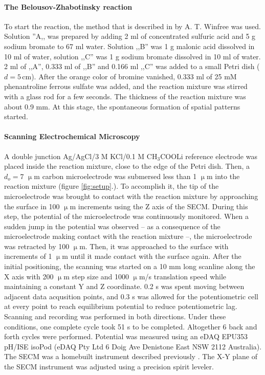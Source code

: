 \documentclass[3p, twocolumn]{elsarticle}
\begin{document}
\paragraph{The Belousov-Zhabotinsky reaction} 
To start the reaction, the method that is described in \cite{winfree} by A. T. Winfree was used.
Solution ''A,, was prepared by adding 2 ml of concentrated sulfuric acid and 5 g sodium bromate to 67 ml water.
Solution ,,B'' was 1 g malonic acid dissolved in 10 ml of water, solution ,,C'' was 1 g sodium bromate dissolved in 10 ml of water.
2 ml of ,,A'', 0.333 ml of ,,B'' and 0.166 ml ,,C'' was added to a small Petri dish ($d=5 \,$cm).
After the orange color of bromine vanished, 0.333 ml of 25 mM phenantroline ferrous sulfate was added, and the reaction mixture was stirred with a glass rod for a few seconds.
The thickness of the reaction mixture was about 0.9 mm.
At this stage, the spontaneous formation of spatial patterns started.

\paragraph{Scanning Electrochemical Microscopy} A double junction Ag/AgCl/3 M KCl/0.1 M CH$_3$COOLi reference electrode was placed inside the reaction mixture, close to the edge of the Petri dish.
Then, a $d_o=7$ $\upmu$m carbon microelectrode was submersed less than 1 $\upmu$m into the reaction mixture (figure \ref{fig:setup}.).
To accomplish it, the tip of the microelectrode was brought to contact with the reaction mixture by approaching the surface in 100 $\upmu$m increments using the Z axis of the SECM.
During this step, the potential of the microelectrode was continuously monitored.
When a sudden jump in the potential was observed -- as a consequence of the microelectrode making contact with the reaction mixture --, the microelectrode was retracted by 100 $\upmu$m.
Then, it was approached to the surface with increments of 1 $\upmu$m until it made contact with the surface again.
After the initial positioning, the scanning was started on a 10 mm long scanline along the X axis with 200 $\upmu$m step size and 1000 $\upmu$m/s translation speed while maintaining a constant Y and Z coordinate.
0.2 s was spent moving between adjacent data acqusition points, and 0.3 s was allowed for the potentiometric cell at every point to reach equilibrium potential to reduce potentiometric lag.
Scanning and recording was performed in both directions.
Under these conditions, one complete cycle took 51 s to be completed.
Altogether 6 back and forth cycles were performed.
Potential was measured using an eDAQ EPU353 pH/ISE isoPod (eDAQ Pty Ltd 6 Doig Ave Denistone East NSW 2112 Australia).
The SECM was a homebuilt instrument described previously \cite{phd}.
The X-Y plane of the SECM instrument was adjusted using a precision spirit leveler.
\end{document}
